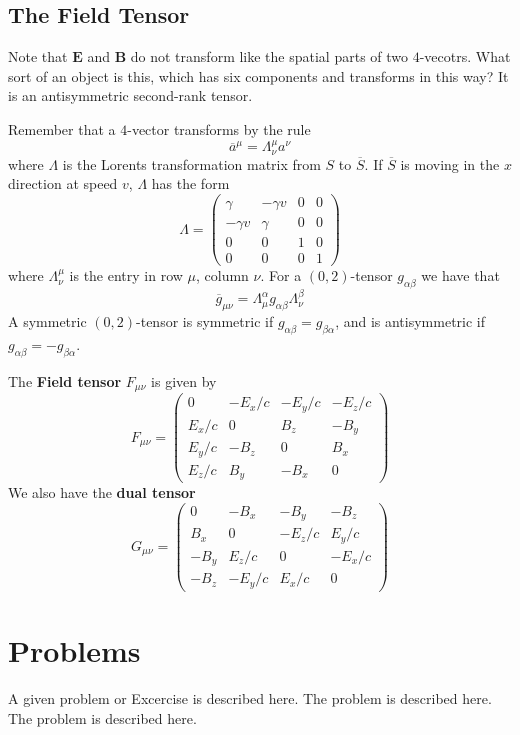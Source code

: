 \subsection{The Field Tensor}

Note that $\mathbf{E}$ and $\mathbf{B}$ do not transform like the spatial parts of two $4$-vecotrs. What sort of an object is this, which has six components and transforms in this way? It is an antisymmetric second-rank tensor.

Remember that a $4$-vector transforms by the rule $$\overline{a}^{\mu} = \Lambda_{\nu}^{\mu}a^{\nu}$$
where $\Lambda$ is the Lorents transformation matrix from $S$ to $\overline{S}$. If $\overline{S}$ is moving in the $x$ direction at speed $v$, $\Lambda$ has the form $$\Lambda = \begin{pmatrix} \gamma & -\gamma v & 0 & 0 \\ -\gamma v& \gamma & 0 & 0 \\ 0 & 0 & 1 & 0 \\ 0 & 0 & 0 & 1 \end{pmatrix}$$
where $\Lambda_{\nu}^{\mu}$ is the entry in row $\mu$, column $\nu$. For a $(0,2)$-tensor $g_{\alpha\beta}$ we have that $$\overline{g}_{\mu\nu} = \Lambda_{\mu}^{\alpha}g_{\alpha\beta}\Lambda_{\nu}^{\beta}$$
A symmetric $(0,2)$-tensor is symmetric if $g_{\alpha\beta} = g_{\beta\alpha}$, and is antisymmetric if $g_{\alpha\beta} = -g_{\beta\alpha}$. 

\begin{defn}
    The \textbf{Field tensor} $F_{\mu\nu}$ is given by $$F_{\mu\nu} = \begin{pmatrix} 0 & -E_x/c & -E_y/c & -E_z/c \\  E_x/c & 0 & B_z & -B_y \\ E_y/c & -B_z & 0 & B_x \\ E_z/c & B_y & -B_x & 0 \end{pmatrix}$$
    We also have the \textbf{dual tensor} $$G_{\mu\nu} = \begin{pmatrix} 0 & -B_x & -B_y & -B_z \\  B_x & 0 & -E_z/c & E_y/c \\ -B_y & E_z/c & 0 & -E_x/c \\ -B_z & -E_y/c & E_x/c & 0 \end{pmatrix}$$
\end{defn}





\section*{Problems}
%
\begin{prob}
\label{prob1}
A given problem or Excercise is described here. The
problem is described here. The problem is described here.
\end{prob}



